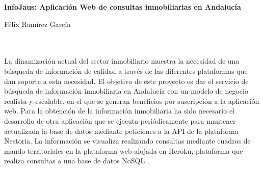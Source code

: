 \begin{center}
{\large\bfseries InfoJaus: Aplicación Web de consultas inmobiliarias en Andalucía}\\
\end{center}

\begin{center}
Félix Ramírez García\\
\end{center}

\begin{flushleft}
	\\
	
	\vspace{0.7cm}
	\\
	La dinamización actual del sector inmobiliario muestra la necesidad de una búsqueda de información de calidad a través de las diferentes plataformas que dan soporte a esta necesidad.  
	El objetivo de este proyecto es dar el servicio de búsqueda de información inmobiliaria en Andalucía con un modelo de negocio realista y escalable, en el que se generan beneficios por suscripción a la aplicación web.
	Para la obtención de la información inmobiliaria ha sido necesario el desarrollo de otra aplicación que se ejecuta periódicamente para mantener actualizada la base de datos mediante peticiones a la API de la plataforma Nestoria.
	La información se visualiza realizando consultas mediante cuadros de mando territoriales en la plataforma web alojada en Heroku, plataforma que realiza consultas a una base de datos NoSQL .
\end{flushleft}

\newpage %


